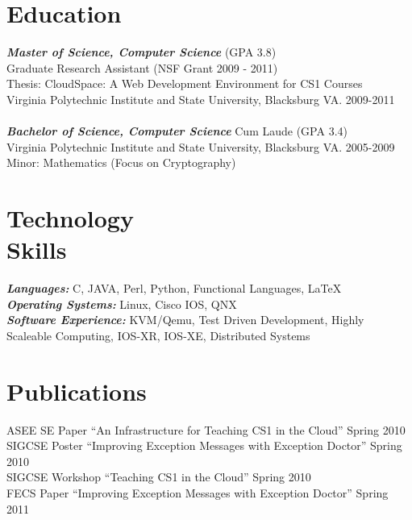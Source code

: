 \documentclass[line,margin]{res}
\begin{document}
\begin{resume}
 
\section{Education} 
        \textbf{\emph{Master of Science, Computer Science}} (GPA 3.8) \\
        Graduate Research Assistant (NSF Grant 2009 - 2011) \\
        Thesis:  CloudSpace: A Web Development Environment for CS1 Courses \\
        Virginia Polytechnic Institute and State University, Blacksburg VA. 2009-2011 \\
\\[-5pt]
        \textbf{\emph{Bachelor of Science, Computer Science}} Cum Laude (GPA 3.4) \\
        Virginia Polytechnic Institute and State University, Blacksburg VA. 2005-2009 \\
        Minor: Mathematics (Focus on Cryptography)

\section{Technology \\ Skills} \textbf{\emph{Languages:}} C, JAVA, Perl, Python, Functional Languages, \LaTeX \\
                \textbf{\emph{Operating Systems:}} Linux, Cisco IOS, QNX \\
                \textbf{\emph{Software Experience:}} KVM/Qemu, Test Driven Development, Highly Scaleable Computing, IOS-XR, IOS-XE, Distributed Systems \\

\section{Publications}
ASEE SE Paper ``An Infrastructure for Teaching CS1 in the Cloud'' Spring 2010 \\
SIGCSE Poster ``Improving Exception Messages with Exception Doctor'' Spring 2010 \\
SIGCSE Workshop ``Teaching CS1 in the Cloud'' Spring 2010 \\
FECS Paper ``Improving Exception Messages with Exception Doctor'' Spring 2011


\end{resume}
\end{document}
